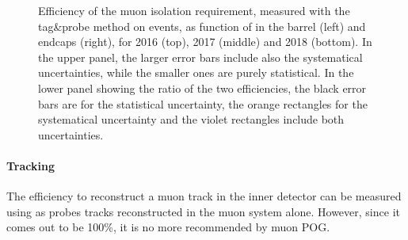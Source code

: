 \begin{figure}[htbp]
\begin{center}
    \caption{Efficiency of the muon isolation requirement, measured with the tag\&probe method on \Z events, as function of \pt in the barrel (left) and endcaps (right), for 2016 (top), 2017 (middle) and 2018 (bottom). In the upper panel, the larger error bars include also the systematical uncertainties, while the smaller ones are purely statistical. In the lower panel showing the ratio of the two efficiencies, the black error bars are for the statistical uncertainty, the orange rectangles for the systematical uncertainty and the violet rectangles include both uncertainties.}
    \label{fig:MuonIDEff_3}
\end{center}
\end{figure}

\paragraph*{Tracking}
The efficiency to reconstruct a muon track in the inner detector can be measured using as probes tracks
reconstructed in the muon system alone. However, since it comes out to be 100\%, it is no more recommended by muon POG. 

